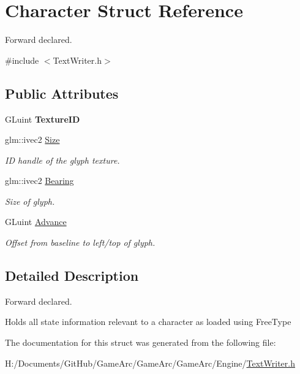 \hypertarget{struct_character}{\section{Character Struct Reference}
\label{struct_character}
}


Forward declared.  




{\ttfamily \#include $<$Text\+Writer.\+h$>$}

\subsection*{Public Attributes}
\begin{DoxyCompactItemize}
\item 
\hypertarget{struct_character_a51d894cc31d79e95fe1a47fb65c6e889}{G\+Luint {\bfseries Texture\+I\+D}}\label{struct_character_a51d894cc31d79e95fe1a47fb65c6e889}

\item 
\hypertarget{struct_character_aaaa598050e0ef590fe6903fd2bab40b8}{glm\+::ivec2 \hyperlink{struct_character_aaaa598050e0ef590fe6903fd2bab40b8}{Size}}\label{struct_character_aaaa598050e0ef590fe6903fd2bab40b8}

\begin{DoxyCompactList}\small\item\em I\+D handle of the glyph texture. \end{DoxyCompactList}\item 
\hypertarget{struct_character_afef98bf9c7f5313d96476f6f3f85f872}{glm\+::ivec2 \hyperlink{struct_character_afef98bf9c7f5313d96476f6f3f85f872}{Bearing}}\label{struct_character_afef98bf9c7f5313d96476f6f3f85f872}

\begin{DoxyCompactList}\small\item\em Size of glyph. \end{DoxyCompactList}\item 
\hypertarget{struct_character_ab35bae8be6740729fc5839c237a659f6}{G\+Luint \hyperlink{struct_character_ab35bae8be6740729fc5839c237a659f6}{Advance}}\label{struct_character_ab35bae8be6740729fc5839c237a659f6}

\begin{DoxyCompactList}\small\item\em Offset from baseline to left/top of glyph. \end{DoxyCompactList}\end{DoxyCompactItemize}


\subsection{Detailed Description}
Forward declared. 

Holds all state information relevant to a character as loaded using Free\+Type 

The documentation for this struct was generated from the following file\+:\begin{DoxyCompactItemize}
\item 
H\+:/\+Documents/\+Git\+Hub/\+Game\+Arc/\+Game\+Arc/\+Game\+Arc/\+Engine/\hyperlink{_text_writer_8h}{Text\+Writer.\+h}\end{DoxyCompactItemize}
